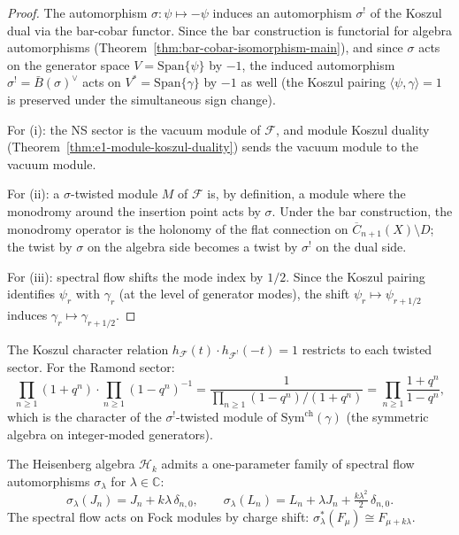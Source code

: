 \begin{proof}
The automorphism $\sigma: \psi \mapsto -\psi$ induces an automorphism
$\sigma^!$ of the Koszul dual via the bar-cobar functor.  Since the bar
construction is functorial for algebra automorphisms
(Theorem~\ref{thm:bar-cobar-isomorphism-main}), and since $\sigma$ acts
on the generator space $V = \mathrm{Span}\{\psi\}$ by $-1$, the induced
automorphism $\sigma^! = \bar{B}(\sigma)^\vee$ acts on
$V^* = \mathrm{Span}\{\gamma\}$ by $-1$ as well (the Koszul pairing
$\langle \psi, \gamma \rangle = 1$ is preserved under the simultaneous
sign change).

For (i): the NS sector is the vacuum module of $\mathcal{F}$, and
module Koszul duality (Theorem~\ref{thm:e1-module-koszul-duality}) sends
the vacuum module to the vacuum module.

For (ii): a $\sigma$-twisted module $M$ of $\mathcal{F}$ is, by
definition, a module where the monodromy around the insertion point
acts by $\sigma$.  Under the bar construction, the monodromy operator
is the holonomy of the flat connection on
$\overline{C}_{n+1}(X) \setminus D$; the twist by $\sigma$ on the
algebra side becomes a twist by $\sigma^!$ on the dual side.

For (iii): spectral flow shifts the mode index by $1/2$.  Since the
Koszul pairing identifies $\psi_r$ with $\gamma_r$
(at the level of generator modes), the shift
$\psi_r \mapsto \psi_{r+1/2}$ induces
$\gamma_r \mapsto \gamma_{r+1/2}$.
\end{proof}

\begin{remark}
\label{rem:twisted-character-identity}
The Koszul character relation
$h_{\mathcal{F}}(t) \cdot h_{\mathcal{F}^!}(-t) = 1$ restricts to
each twisted sector.  For the Ramond sector:
\[
\prod_{n \geq 1}(1 + q^n) \cdot \prod_{n \geq 1}(1 - q^n)^{-1}
= \frac{1}{\prod_{n \geq 1}(1 - q^n)/(1 + q^n)}
= \prod_{n \geq 1}\frac{1 + q^n}{1 - q^n},
\]
which is the character of the $\sigma^!$-twisted module of
$\mathrm{Sym}^{\mathrm{ch}}(\gamma)$ (the symmetric algebra on
integer-moded generators).
\end{remark}

\begin{definition}\label{def:heisenberg-spectral-flow}
The Heisenberg algebra $\mathcal{H}_k$ admits a one-parameter
family of spectral flow automorphisms $\sigma_\lambda$ for
$\lambda \in \mathbb{C}$:
\[
\sigma_\lambda(J_n) = J_n + k\lambda\,\delta_{n,0},
\qquad
\sigma_\lambda(L_n) = L_n + \lambda J_n
+ \tfrac{k\lambda^2}{2}\,\delta_{n,0}.
\]
The spectral flow acts on Fock modules by charge shift:
$\sigma_\lambda^*(F_\mu) \cong F_{\mu + k\lambda}$.
\end{definition}

